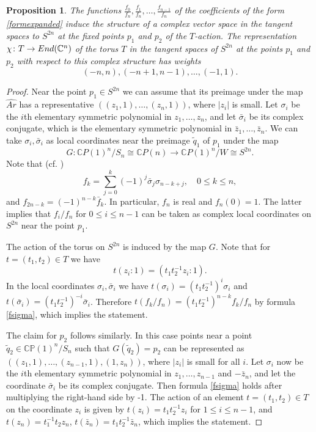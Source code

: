 \documentclass[11pt]{amsart}
\newtheorem{prop}[theorem]{Proposition}
\theoremstyle{definition}
\theoremstyle{remark}
\numberwithin{equation}{section}
\newcommand{\CP}{\mathbb{CP}}
\begin{document}
\begin{prop}\label{third}
    The functions $\frac{f_0}{f_n},\frac{f_1}{f_n},\dots,\frac{f_{n-1}}{f_n}$ of the coefficients of the form \eqref{formexpanded} induce the structure of a complex vector space in the tangent spaces to $S^{2n}$ at the fixed points  $p_1$ and $p_2$ of the $T$-action. The representation $\chi\colon T \to {\rm End}(\mathbb C^n)$ of the torus $T$ in the tangent spaces of $S^{2n}$ at the points $p_1$ and $p_2$ with respect to this complex structure has weights 
    \[
    (-n,n), (-n+1, n-1), \ldots, (-1, 1). 
    \]
\end{prop}
    \begin{proof}
    
        Near the point $p_1\in S^{2n}$ we can assume that its preimage under the map $\widehat{Ar}$ 
        has a representative $\left((z_1,1), \ldots, (z_n, 1)\right)$, where 
$|z_i|$ is small. Let $\sigma_i$ be the $i$th elementary symmetric polynomial in $z_1, \ldots, z_n$, and let $\bar \sigma_i$ be its complex conjugate, which is the elementary symmetric polynomial in $\bar z_1, \ldots, \bar z_n$. We can take $\sigma_i, \bar\sigma_i$ as local coordinates near the preimage $\tilde q_1$ of $p_1$  under the map 
    $$
    G\colon \mathbb{C}P(1)^n/S_n\cong \mathbb{C}P(n) \to \mathbb{C}P(1)^n/W\cong S^{2n}.
    $$ Note that (cf. \cite{Arnold1996})
\begin{equation}
    \label{fsigma}
f_k = \sum_{j=0}^k (-1)^j \bar \sigma_j \sigma_{n-k+j}, \quad 0\le k \le n,
\end{equation}
and $f_{2n-k} = (-1)^{n-k} \bar f_k$. In particular, $f_n$ is real and $f_n(0)=1$. The latter implies that $f_i/f_n$ for  $0\le i \le n-1$ can be taken as complex local coordinates on $S^{2n}$ near the point $p_1$. 
 
The action of the torus on $S^{2n}$ is induced by the map $G$. Note that for $t=(t_1, t_2) \in T$ we have 
\begin{equation*}
\label{tz}   
t (z_i:1) = ( t_1 t_2^{-1} z_i:1).
\end{equation*}
  In the local coordinates $\sigma_i,\bar \sigma_i$ we have 
$t(\sigma _i) = (t_1 t_2^{-1})^i \sigma_i$ and $t(\bar \sigma_i) = (t_1 t_2^{-1})^{-i} \bar\sigma_i$. Therefore $t(f_k/f_n) = (t_1 t_2^{-1})^{n-k} f_k/f_n$ by formula \eqref{fsigma}, which implies the statement. 

The claim for $p_2$ follows similarly. In this case points near a point $\tilde q_2\in \CP(1)^n/S_n$ such that $G(\tilde q_2)=p_2$ can be represented as $\left((z_1, 1), \ldots, (z_{n-1}, 1), (1, z_n)\right)$, where $|z_i|$ is small for all $i$. 
Let $\sigma_i$ now be the $i$th elementary symmetric polynomial in $z_1, \ldots, z_{n-1}$ and $-\bar z_n$, and let the coordinate $\bar \sigma_i$ be its complex conjugate. Then  formula \eqref{fsigma} holds after multiplying the right-hand side by -1. The action of an element $t=(t_1, t_2)\in T$  on the coordinate $z_i$ is given by $t(z_i) = t_1 t_2^{-1} z_i$ for $1\le i \le n-1$, and $t(z_n)=t_1^{-1} t_2 z_n$, $t(\bar z_n)=t_1 t_2^{-1} \bar z_n$, which implies the statement. 
    \end{proof}
\end{document}
